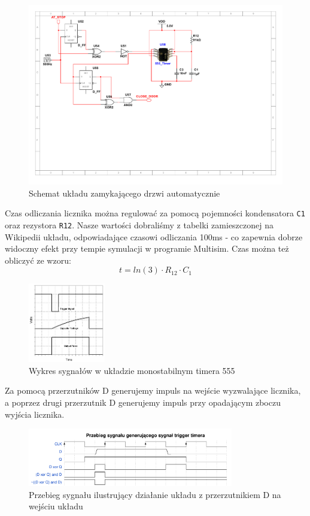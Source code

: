 \documentclass[a4paper]{article}
\begin{document}
\begin{figure}[H]
    \centering
    \includegraphics[width=\textwidth]{door_auto_mechanism_schemat.pdf}
    \caption{Schemat układu zamykającego drzwi automatycznie}
\end{figure}

Czas odliczania licznika można regulować za pomocą pojemności kondensatora
\verb|C1| oraz rezystora \verb|R12|. Nasze wartości dobraliśmy z tabelki zamieszczonej na
Wikipedii układu, odpowiadające czasowi odliczania 100ms - co zapewnia dobrze 
widoczny efekt przy tempie symulacji w programie Multisim. Czas można też obliczyć ze wzoru:
\[ t = ln(3) \cdot R_{12} \cdot C_1 \]

\begin{figure}[H]
    \centering
    \includegraphics[width=0.3\textwidth]{NE555_Monotable.png}
    \caption{Wykres sygnałów w układzie monostabilnym timera 555}
\end{figure}

Za pomocą przerzutników D generujemy impuls na wejście wyzwalające licznika, a poprzez drugi przerzutnik D generujemy impuls przy opadającym
zboczu wyjścia licznika.

\begin{figure}[H]
    \centering
    \includegraphics[width=0.8\textwidth]{trigger_waveform.pdf}
    \caption{Przebieg sygnału ilustrujący działanie układu z przerzutnikiem D na wejściu układu}
\end{figure}
\end{document}
